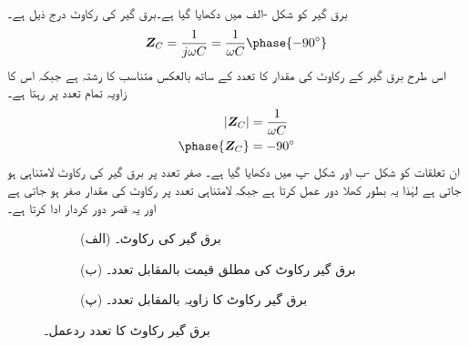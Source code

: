 برق گیر کو شکل -الف میں دکھایا گیا ہے۔برق گیر کی رکاوٹ درج ذیل ہے۔
\begin{align}
\bZ_C=\frac{1}{j\omega C}=\frac{1}{\omega C}\phase{-90^{\circ}}
\end{align}
اس طرح برق گیر کے رکاوٹ کی مقدار کا تعدد کے ساتھ بالعکس متناسب کا رشتہ ہے جبکہ اس کا زاویہ تمام تعدد پر  رہتا ہے۔
\begin{align}
\abs{\bZ_C}&=\frac{1}{\omega C}\\
\phase{\bZ_C}&=-90^{\circ}
\end{align}
ان تعلقات کو شکل -ب اور شکل -پ میں دکھایا گیا ہے۔ صفر تعدد پر برق گیر کی رکاوٹ لامتناہی ہو جاتی ہے لہٰذا یہ بطور کھلا دور عمل کرتا ہے جبکہ لامتناہی تعدد پر رکاوٹ کی مقدار صفر ہو جاتی ہے اور یہ قصر دور کردار ادا کرتا ہے۔
\begin{figure}
\centering
\begin{subfigure}{1\textwidth}
\centering
{}
\caption*{(الف) برق گیر کی رکاوٹ۔}
\end{subfigure}
\begin{subfigure}{0.5\textwidth}
\centering
{}%
\caption*{(ب) برق گیر رکاوٹ کی مطلق قیمت بالمقابل تعدد۔}
\end{subfigure}%
\begin{subfigure}{0.5\textwidth}
\centering
{}%
\caption*{(پ) برق گیر رکاوٹ کا زاویہ بالمقابل تعدد۔}
\end{subfigure}%
\caption{برق گیر رکاوٹ کا تعدد ردعمل۔}
\label{شکل_تعددی_برق_گیری_ردعمل}
\end{figure}

